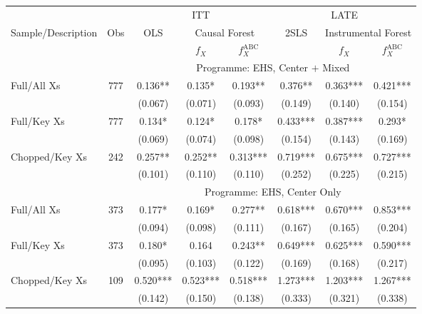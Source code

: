 \begin{tabular}{lccccccc}
\toprule 
\midrule 
\multicolumn{2}{c}{} & \multicolumn{3}{c}{ITT} & \multicolumn{3}{c}{LATE} \\
 \cmidrule(lr){3-5} \cmidrule(lr){6-8} 
Sample/Description & Obs & OLS & \multicolumn{2}{c}{Causal Forest} & 2SLS & \multicolumn{2}{c}{Instrumental Forest} \\
\multicolumn{3}{c}{} & $f_X$ & $f_X^{\text{ABC}}$ &  & $f_X$ & $f_X^{\text{ABC}}$ \\
\midrule 
 &  & \multicolumn{6}{c}{Programme: EHS, Center $+$ Mixed} \\
 \cmidrule(lr){3-8} 
Full/All Xs & 777 & 0.136** & 0.135* & 0.193** & 0.376** & 0.363*** & 0.421*** \\
 &  & (0.067) & (0.071) & (0.093) & (0.149) & (0.140) & (0.154) \\
Full/Key Xs & 777 & 0.134* & 0.124* & 0.178* & 0.433*** & 0.387*** & 0.293* \\
 &  & (0.069) & (0.074) & (0.098) & (0.154) & (0.143) & (0.169) \\
Chopped/Key Xs & 242 & 0.257** & 0.252** & 0.313*** & 0.719*** & 0.675*** & 0.727*** \\
 &  & (0.101) & (0.110) & (0.110) & (0.252) & (0.225) & (0.215) \\
\midrule 
 &  & \multicolumn{6}{c}{Programme: EHS, Center Only} \\
 \cmidrule(lr){3-8} 
Full/All Xs & 373 & 0.177* & 0.169* & 0.277** & 0.618*** & 0.670*** & 0.853*** \\
 &  & (0.094) & (0.098) & (0.111) & (0.167) & (0.165) & (0.204) \\
Full/Key Xs & 373 & 0.180* & 0.164 & 0.243** & 0.649*** & 0.625*** & 0.590*** \\
 &  & (0.095) & (0.103) & (0.122) & (0.169) & (0.168) & (0.217) \\
Chopped/Key Xs & 109 & 0.520*** & 0.523*** & 0.518*** & 1.273*** & 1.203*** & 1.267*** \\
 &  & (0.142) & (0.150) & (0.138) & (0.333) & (0.321) & (0.338) \\
\midrule 
\bottomrule 
\end{tabular}
